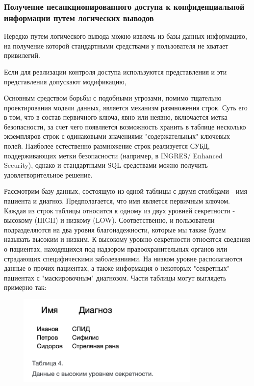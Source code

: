 \subsubsection{Получение несанкционированного доступа к конфиденциальной информации путем логических выводов}
Нередко путем логического вывода можно извлечь из базы данных информацию, на получение которой стандартными средствами у пользователя не хватает привилегий.

Если для реализации контроля доступа используются представления и эти представления допускают модификацию,  %

Основным средством борьбы с подобными угрозами, помимо тщательно проектирования модели данных, является механизм размножения строк. Суть его в том, что в состав первичного ключа, явно или неявно, включается метка безопасности, за счет чего появляется возможность хранить в таблице несколько экземпляров строк с одинаковыми значениями "содержательных" ключевых полей. Наиболее естественно размножение строк реализуется  СУБД, поддерживающих метки безопасности (например, в INGRES/
Enhanced Security), однако и стандартными SQL-средствами можно получить удовлетворительное решение.

Рассмотрим базу данных, состоящую из одной таблицы с двумя столбцами - имя пациента и диагноз. Предполагается, что имя является первичным ключом. Каждая из строк таблицы относится к одному из двух уровней секретности - высокому (HIGH) и низкому (LOW). Соответственно, и пользователи подразделяются на два уровня благонадежности, которые мы также будем называть высоким и низким.
К высокому уровню секретности относятся сведения о пациентах, находящихся под надзором правоохранительных органов или страдающих специфическими заболеваниями. На низком уровне располагаются данные о прочих пациентах, а также информация о некоторых "секретных" пациентах с "маскировочным" диагнозом. Части таблицы могут выглядеть примерно так:

\begin{figure}[h]
    \centering
    \includegraphics[width=0.8\textwidth]{assets/dick_pic1.png}
\end{figure}

